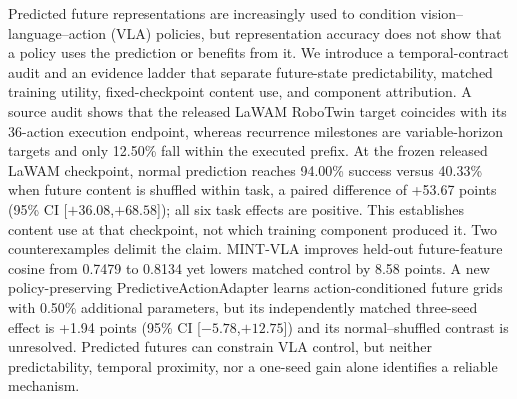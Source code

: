 Predicted future representations are increasingly used to condition
vision--language--action (VLA) policies, but representation accuracy does not
show that a policy uses the prediction or benefits from it.  We introduce a
temporal-contract audit and an evidence ladder that separate future-state
predictability, matched training utility, fixed-checkpoint content use, and
component attribution.  A source audit shows that the released LaWAM RoboTwin
target coincides with its 36-action execution endpoint, whereas recurrence
milestones are variable-horizon targets and only 12.50\% fall within the
executed prefix.  At the frozen released LaWAM checkpoint, normal prediction
reaches 94.00\% success versus 40.33\% when future content is shuffled within
task, a paired difference of +53.67 points (95\% CI
[$+36.08$,$+68.58$]); all six task effects are positive.  This establishes
content use at that checkpoint, not which training component produced it.  Two
counterexamples delimit the claim.  MINT-VLA improves held-out future-feature
cosine from 0.7479 to 0.8134 yet lowers matched control by 8.58 points.  A new
policy-preserving PredictiveActionAdapter learns action-conditioned future
grids with 0.50\% additional parameters, but its independently matched
three-seed effect is +1.94 points (95\% CI [$-5.78$,$+12.75$]) and its
normal--shuffled contrast is unresolved.  Predicted futures can constrain VLA
control, but neither predictability, temporal proximity, nor a one-seed gain
alone identifies a reliable mechanism.

